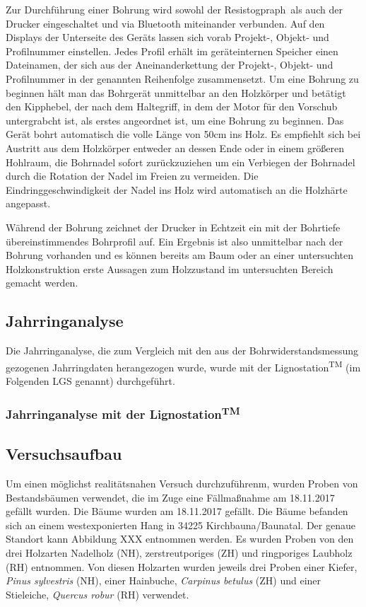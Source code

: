 \documentclass[a4paper, halfparskip]{article}
\def\SymbReg{\textsuperscript{\textregistered}}
\begin{document}
Zur Durchführung einer Bohrung wird sowohl der Resistogpraph\SymbReg\ als auch
der Drucker eingeschaltet und via Bluetooth miteinander verbunden. Auf den
Displays der Unterseite des Geräts lassen sich vorab Projekt-, Objekt- und
Profilnummer einstellen. Jedes Profil erhält im geräteinternen Speicher einen
Dateinamen, der sich aus der Aneinanderkettung der Projekt-, Objekt- und
Profilnummer in der genannten Reihenfolge zusammensetzt. Um eine Bohrung zu
beginnen hält man das Bohrgerät unmittelbar an den Holzkörper und betätigt
den Kipphebel, der nach dem Haltegriff, in dem der Motor für den Vorschub
untergrabcht ist, als erstes angeordnet ist, um eine Bohrung zu beginnen. Das
Gerät bohrt automatisch die volle Länge von 50cm ins Holz. Es empfiehlt sich
bei Austritt aus dem Holzkörper entweder an dessen Ende oder in einem größeren
Hohlraum, die Bohrnadel sofort zurückzuziehen um ein Verbiegen der Bohrnadel
durch die Rotation der Nadel im Freien zu vermeiden.  Die
Eindringgeschwindigkeit der Nadel ins Holz wird automatisch an die Holzhärte
angepasst.

Während der Bohrung zeichnet der Drucker in Echtzeit ein mit der Bohrtiefe
übereinstimmendes Bohrprofil auf. Ein Ergebnis ist also unmittelbar nach der
Bohrung vorhanden und es können bereits am Baum oder an einer untersuchten
Holzkonstruktion erste Aussagen zum Holzzustand im untersuchten Bereich
gemacht werden.

\subsection{Jahrringanalyse}
Die Jahrringanalyse, die zum Vergleich mit den aus der Bohrwiderstandsmessung
gezogenen Jahrringdaten herangezogen wurde, wurde mit der
Lignostation\textsuperscript{TM} (im Folgenden LGS genannt) durchgeführt.

\subsubsection{Jahrringanalyse mit der Lignostation\textsuperscript{TM}}


\subsection{Versuchsaufbau}
Um einen möglichst realitätsnahen Versuch durchzuführenm, wurden Proben von
Bestandsbäumen verwendet, die im Zuge eine Fällmaßnahme am 18.11.2017 gefällt
wurden. Die Bäume wurden am 18.11.2017 gefällt. Die Bäume befanden sich an
einem westexponierten Hang in 34225 Kirchbauna/Baunatal. Der genaue Standort
kann Abbildung XXX entnommen werden. Es wurden Proben von den drei Holzarten
Nadelholz (NH), zerstreutporiges (ZH) und ringporiges Laubholz (RH) entnommen.
Von diesen Holzarten wurden jeweils drei Proben einer Kiefer, \textit{Pinus
sylvestris} (NH), einer Hainbuche, \textit{Carpinus betulus} (ZH) und einer
Stieleiche, \textit{Quercus robur} (RH) verwendet.
\end{document}
